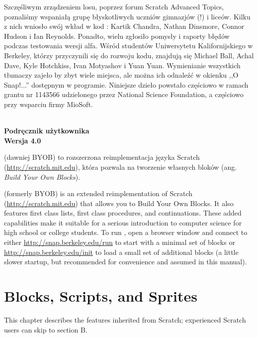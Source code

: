 \documentclass{report}
\begin{document}
Szczęśliwym zrządzeniem losu, poprzez forum Scratch Advanced Topics, poznaliśmy wspaniałą grupę błyskotliwych uczniów gimnazjów (!\@) i liceów. Kilku z nich wniosło swój wkład w kod : Kartik Chandra, Nathan Dinsmore, Connor Hudson i Ian Reynolds. Ponadto, wielu zgłosiło pomysły i raporty błędów podczas testowania wersji alfa. Wśród studentów Uniwersytetu Kalifornijskiego w Berkeley, którzy przyczynili się do rozwoju kodu, znajdują się Michael Ball, Achal Dave, Kyle Hotchkiss, Ivan Motyashov i Yuan Yuan. Wymienianie wszystkich tłumaczy zajeło by zbyt wiele miejsca, ale można ich odnaleźć w okienku ,,O Snap!...'' dostępnym w programie. Niniejsze dzieło powstało częściowo w ramach grantu nr 1143566 udzielonego przez National Science Foundation, a częściowo przy wsparciu firmy MioSoft.

\begin{titlepage}

\begin{center}
\bf \Huge \Snap{} \\ Podręcznik użytkownika \\ \huge Wersja 4.0 \vspace{40pt}
\end{center}

\Snap{} (dawniej BYOB) to rozszerzona reimplementacja języka Scratch (\url{http://scratch.mit.edu}), która pozwala na tworzenie własnych bloków (ang. \textit{Build Your Own Blocks}).

\Snap{} (formerly BYOB) is an extended reimplementation of Scratch (\url{http://scratch.mit.edu}) that allows you to Build Your Own Blocks. It also features first class lists, first class procedures, and continuations. These added capabilities make it suitable for a serious introduction to computer science for high school or college students.  To run \Snap{}, open a browser window and connect to either \url{http://snap.berkeley.edu/run} to start with a minimal set of blocks or \url{http://snap.berkeley.edu/init} to load a small set of additional blocks (a little slower startup, but recommended for convenience and assumed in this manual).

\end{titlepage}

\chapter{Blocks, Scripts, and Sprites}

This chapter describes the \Snap{} features inherited from Scratch; experienced Scratch users can skip to section B.
\end{document}
